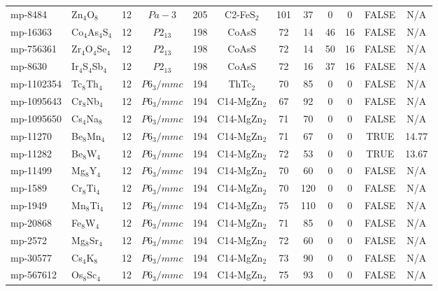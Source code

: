 {\begin{longtable}{llcccccccccc}
    mp-8484 & Zn$_{4}$O$_{8}$ & 12    & $Pa-3$ & 205   & C2-FeS$_{2}$ & 101   & 37    & 0     & 0     & FALSE & N/A \\
    mp-16363 & Co$_{4}$As$_{4}$S$_{4}$ & 12    & $P2_13$ & 198   & CoAsS & 72    & 14    & 46    & 16    & FALSE & N/A \\
    mp-756361 & Zr$_{4}$O$_{4}$Se$_{4}$ & 12    & $P2_13$ & 198   & CoAsS & 72    & 14    & 50    & 16    & FALSE & N/A \\
    mp-8630 & Ir$_{4}$S$_{4}$Sb$_{4}$ & 12    & $P2_13$ & 198   & CoAsS & 72    & 16    & 37    & 16    & FALSE & N/A \\
    mp-1102354 & Tc$_{8}$Th$_{4}$ & 12    & $P6_3/mmc$ & 194   & ThTc$_{2}$ & 70    & 85    & 0     & 0     & FALSE & N/A \\
    mp-1095643 & Cr$_{8}$Nb$_{4}$ & 12    & $P6_3/mmc$ & 194   & C14-MgZn$_{2}$ & 67    & 92    & 0     & 0     & FALSE & N/A \\
    mp-1095650 & Cs$_{4}$Na$_{8}$ & 12    & $P6_3/mmc$ & 194   & C14-MgZn$_{2}$ & 71    & 70    & 0     & 0     & FALSE & N/A \\
    mp-11270 & Be$_{8}$Mn$_{4}$ & 12    & $P6_3/mmc$ & 194   & C14-MgZn$_{2}$ & 71    & 67    & 0     & 0     & TRUE  & 14.77  \\
    mp-11282 & Be$_{8}$W$_{4}$ & 12    & $P6_3/mmc$ & 194   & C14-MgZn$_{2}$ & 72    & 53    & 0     & 0     & TRUE  & 13.67  \\
    mp-11499 & Mg$_{8}$Y$_{4}$ & 12    & $P6_3/mmc$ & 194   & C14-MgZn$_{2}$ & 70    & 60    & 0     & 0     & FALSE & N/A \\
    mp-1589 & Cr$_{8}$Ti$_{4}$ & 12    & $P6_3/mmc$ & 194   & C14-MgZn$_{2}$ & 70    & 120   & 0     & 0     & FALSE & N/A \\
    mp-1949 & Mn$_{8}$Ti$_{4}$ & 12    & $P6_3/mmc$ & 194   & C14-MgZn$_{2}$ & 75    & 110   & 0     & 0     & FALSE & N/A \\
    mp-20868 & Fe$_{8}$W$_{4}$ & 12    & $P6_3/mmc$ & 194   & C14-MgZn$_{2}$ & 71    & 85    & 0     & 0     & FALSE & N/A \\
    mp-2572 & Mg$_{8}$Sr$_{4}$ & 12    & $P6_3/mmc$ & 194   & C14-MgZn$_{2}$ & 72    & 60    & 0     & 0     & FALSE & N/A \\
    mp-30577 & Cs$_{4}$K$_{8}$ & 12    & $P6_3/mmc$ & 194   & C14-MgZn$_{2}$ & 73    & 90    & 0     & 0     & FALSE & N/A \\
    mp-567612 & Os$_{8}$Sc$_{4}$ & 12    & $P6_3/mmc$ & 194   & C14-MgZn$_{2}$ & 75    & 93    & 0     & 0     & FALSE & N/A \\

\end{longtable}}
